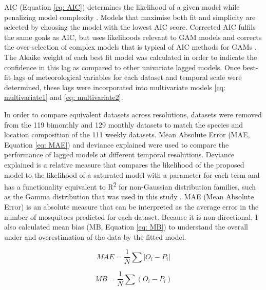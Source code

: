 AIC (Equation \ref{eq: AIC}) determines the likelihood of a given model while penalizing model complexity \citep{JOHNSON2004101}. Models that maximise both fit and simplicity are selected by choosing the model with the lowest AIC score. Corrected AIC fulfils the same goals as AIC, but uses likelihoods relevant to GAM models and corrects the over-selection of complex models that is typical of AIC methods for GAMs \citep{Greven2010, Wood2016}. 
The Akaike weight of each best fit model was calculated in order to indicate the confidence in this lag as compared to other univariate lagged models. Once best-fit lags of meteorological variables for each dataset and temporal scale were determined, these lags were incorporated into multivariate models \ref{eq: multivariate1} and \ref{eq: multivariate2}. 


In order to compare equivalent datasets across resolutions, datasets were removed from the 119 bimonthly and 129 monthly datasets to match the species and location composition of the 111 weekly datasets. Mean Absolute Error (MAE, Equation \ref{eq: MAE}) and deviance explained were used to compare the performance of lagged models at different temporal resolutions.  Deviance explained is a relative measure that compares the likelihood of the proposed model to the likelihood of a saturated model with a parameter for each term and has a functionality equivalent to R\textsuperscript{2} for non-Gaussian distribution families, such as the Gamma distribution that was used in this study \citep{Nelder1972}. MAE (Mean Absolute Error) is an absolute measure that can be interpreted as the average error in the number of mosquitoes predicted for each dataset. Because it is non-directional, I also calculated mean bias (MB, Equation \ref{eq: MB}) to understand the overall under and overestimation of the data by the fitted model. 

\begin{equation}
MAE = \frac{1}{N}\sum{|O_i - P_i|}
\label{eq: MAE}
\end{equation}

\begin{equation}
MB = \frac{1}{N}\sum{(O_i - P_i)}
\label{eq: MB}
\end{equation}

